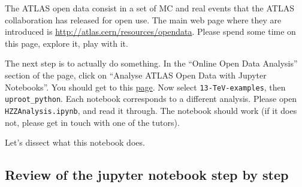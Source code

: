 
The ATLAS open data consist in a set of MC and real events that the ATLAS collaboration has released for open use. The main web page where they are introduced is \url{http://atlas.cern/resources/opendata}. Please spend some time on this page, explore it, play with it.

The next step is to actually do something. In the ``Online Open Data Analysis'' section of the page, click on ``Analyse ATLAS Open Data with Jupyter Notebooks''. You should get to this \href{https://mybinder.org/v2/gh/atlas-outreach-data-tools/notebooks-collection-opendata/master/}{page}. Now select \verb|13-TeV-examples|, then \verb|uproot_python|. Each notebook corresponds to a different analysis. Please open \verb|HZZAnalysis.ipynb|, and read it through. The notebook should work (if it does not, please get in touch with one of the tutors). 

Let's dissect what this notebook does. 

\subsection{Review of the jupyter notebook step by step}
\label{sec:review_notebook}


